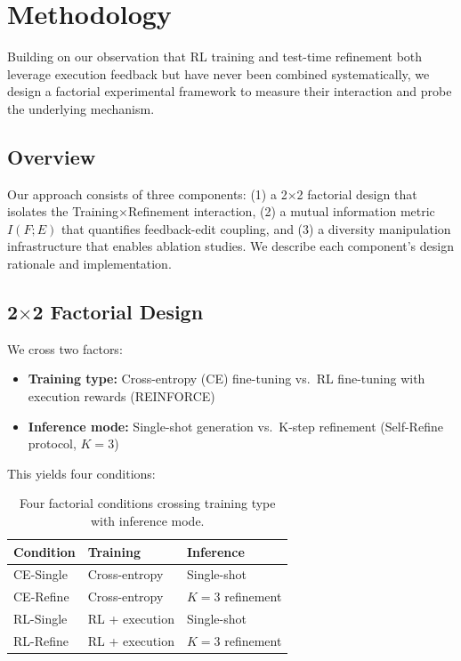 \section{Methodology}
\label{sec:methodology}

Building on our observation that RL training and test-time refinement both leverage execution feedback but have never been combined systematically, we design a factorial experimental framework to measure their interaction and probe the underlying mechanism.

\subsection{Overview}

Our approach consists of three components: (1) a 2$\times$2 factorial design that isolates the Training$\times$Refinement interaction, (2) a mutual information metric $I(F;E)$ that quantifies feedback-edit coupling, and (3) a diversity manipulation infrastructure that enables ablation studies. We describe each component's design rationale and implementation.

\subsection{2$\times$2 Factorial Design}

We cross two factors:

\begin{itemize}
    \item \textbf{Training type:} Cross-entropy (CE) fine-tuning vs.\ RL fine-tuning with execution rewards (REINFORCE)
    \item \textbf{Inference mode:} Single-shot generation vs.\ K-step refinement (Self-Refine protocol, $K=3$)
\end{itemize}

This yields four conditions:

\begin{table}[h]
\centering
\begin{tabular}{lll}
\toprule
Condition & Training & Inference \\
\midrule
CE-Single & Cross-entropy & Single-shot \\
CE-Refine & Cross-entropy & $K=3$ refinement \\
RL-Single & RL + execution & Single-shot \\
RL-Refine & RL + execution & $K=3$ refinement \\
\bottomrule
\end{tabular}
\caption{Four factorial conditions crossing training type with inference mode.}
\label{tab:conditions}
\end{table}

